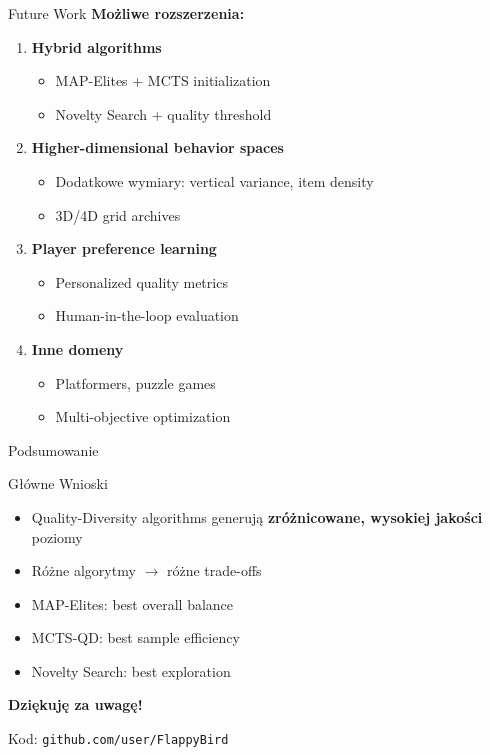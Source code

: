 \documentclass{beamer}
\begin{document}
\begin{frame}{Future Work}
\textbf{Możliwe rozszerzenia:}

\begin{enumerate}
\item \textbf{Hybrid algorithms}
\begin{itemize}
\item MAP-Elites + MCTS initialization
\item Novelty Search + quality threshold
\end{itemize}

\item \textbf{Higher-dimensional behavior spaces}
\begin{itemize}
\item Dodatkowe wymiary: vertical variance, item density
\item 3D/4D grid archives
\end{itemize}

\item \textbf{Player preference learning}
\begin{itemize}
\item Personalized quality metrics
\item Human-in-the-loop evaluation
\end{itemize}

\item \textbf{Inne domeny}
\begin{itemize}
\item Platformers, puzzle games
\item Multi-objective optimization
\end{itemize}
\end{enumerate}
\end{frame}

\begin{frame}{Podsumowanie}
\begin{block}{Główne Wnioski}
\begin{itemize}
\item Quality-Diversity algorithms generują \textbf{zróżnicowane, wysokiej jakości} poziomy
\item Różne algorytmy $\rightarrow$ różne trade-offs
\item MAP-Elites: best overall balance
\item MCTS-QD: best sample efficiency
\item Novelty Search: best exploration
\end{itemize}
\end{block}

\vspace{0.5cm}
\centering
\Large{\textbf{Dziękuję za uwagę!}}

\vspace{0.5cm}
\normalsize
Kod: \texttt{github.com/user/FlappyBird}
\end{frame}
\end{document}
